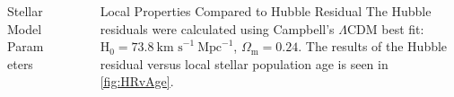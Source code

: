 \documentclass[final]{beamer}
\newlength{\sepwid}
\newlength{\onecolwid}
\begin{document}
\begin{frame}[t]
\begin{columns}[t]
\begin{column}{\onecolwid}
\begin{block}{Stellar Model Parameters}
\end{block}
\end{column}

\begin{column}{\sepwid}\end{column}\label{centerspace}

\begin{column}{\onecolwid}


\begin{block}{Local Properties Compared to Hubble Residual}
The Hubble residuals were calculated using Campbell's $\Lambda$CDM best fit: $\text{H}_{0}=73.8~\text{km s}^{-1}~\text{Mpc}^{-1}$, $\Omega_{\text{m}}=0.24$. The results of the Hubble residual versus local stellar population age is seen in \cref{fig:HRvAge}.



\end{block}
\end{column}
\end{columns}
\end{frame}
\end{document}
